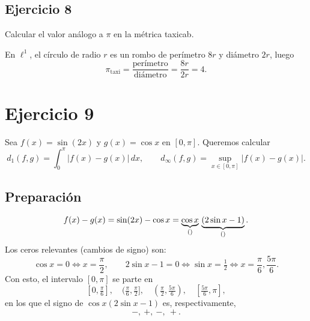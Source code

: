\documentclass[12pt]{article}
\begin{document}
\subsection*{Ejercicio 8}
Calcular el valor análogo a $\pi$ en la métrica taxicab.

\medskip
En $\ell^1$, el círculo de radio $r$ es un rombo de perímetro $8r$ y diámetro $2r$, luego
\[
\pi_{\text{taxi}} = \frac{\text{perímetro}}{\text{diámetro}} = \frac{8r}{2r} = 4.
\]

\section*{Ejercicio 9}
Sea $f(x)=\sin(2x)$ y $g(x)=\cos x$ en $[0,\pi]$.
Queremos calcular
\[
d_1(f,g)=\int_0^\pi |f(x)-g(x)|\,dx,
\qquad
d_\infty(f,g)=\sup_{x\in[0,\pi]} |f(x)-g(x)|.
\]

\subsection*{Preparación}
\[
f(x)-g(x)=\sin(2x)-\cos x
= \underbrace{\cos x}_{(\*)}\,\underbrace{(2\sin x-1)}_{(\*\*)}.
\]
Los ceros relevantes (cambios de signo) son:
\[
\cos x=0 \iff x=\frac{\pi}{2}, \qquad
2\sin x-1=0 \iff \sin x=\tfrac12 \iff x=\frac{\pi}{6},\frac{5\pi}{6}.
\]
Con esto, el intervalo $[0,\pi]$ se parte en
\[
[0,\tfrac{\pi}{6}],\quad
(\tfrac{\pi}{6},\tfrac{\pi}{2}],\quad
(\tfrac{\pi}{2},\tfrac{5\pi}{6}),\quad
[\tfrac{5\pi}{6},\pi],
\]
en los que el signo de $\cos x(2\sin x-1)$ es, respectivamente,
\[
-,\ +,\ -,\ +.
\]
\end{document}

